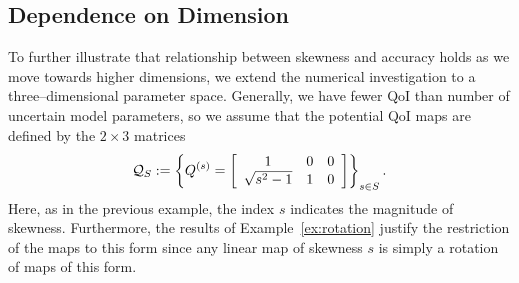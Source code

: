
\subsection{Dependence on Dimension}\label{ex:3dmap}
To further illustrate that relationship between skewness and accuracy holds as we move towards higher dimensions, we extend the numerical investigation to a three--dimensional parameter space.
Generally, we have fewer QoI than number of uncertain model parameters, so we assume that the potential QoI maps are defined by the $2\times 3$ matrices
\begin{equation}\label{eq:qmap3}
\qspace_S := \left \lbrace \qoi^{(s)} =  \mat{ccc}{1 & 0 & 0\\ \sqrt{s^2 - 1}& 1 & 0} \right \rbrace_{s\in S}.
\end{equation}
Here, as in the previous example, the index $s$ indicates the magnitude of skewness.
Furthermore, the results of Example~\ref{ex:rotation} justify the restriction of the maps to this form since any linear map of skewness $s$ is simply a rotation of maps of this form.

%
%


